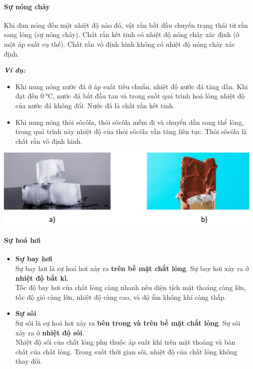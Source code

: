 \begin{tomtat}
\paragraph{Sự nóng chảy}
\begin{dn}
	Khi đun nóng đến một nhiệt độ nào đó, vật rắn bắt đầu chuyển trạng thái từ rắn sang lỏng (sự nóng chảy). Chất rắn kết tinh có nhiệt độ nóng chảy xác định (ở một áp suất cụ thể). Chất rắn vô định hình không có nhiệt độ nóng chảy xác định.\\
\end{dn}
	\textbf{\textit{Ví dụ:}}
	\begin{itemize}
		\item Khi nung nóng nước đá ở áp suất tiêu chuẩn, nhiệt độ nước đá tăng dần. Khi đạt đến $\SI{0}{\celsius}$, nước đá bắt đầu tan và trong suốt quá trình hoá lỏng nhiệt độ của nước đá không đổi. Nước đá là chất rắn kết tinh.
		\item Khi nung nóng thỏi sôcôla, thỏi sôcôla mềm đi và chuyển dần sang thể lỏng, trong quá trình này nhiệt độ của thỏi sôcôla vẫn tăng liên tục. Thỏi sôcôla là chất rắn vô định hình.
	\end{itemize}
	\begin{center}
		\includegraphics[width=0.6\linewidth]{figs/VN12-Y24-PH-SYL-001-5}
	\end{center}
\paragraph{Sự hoá hơi}
\begin{dn}
	\begin{itemize}
		\item \textbf{Sự bay hơi}\\
		Sự bay hơi là sự hoá hơi xảy ra \textbf{trên bề mặt chất lỏng}. Sự bay hơi xảy ra ở \textbf{nhiệt độ bất kì}.\\
		Tốc độ bay hơi của chất lỏng càng nhanh nếu diện tích mặt thoáng càng lớn, tốc độ gió càng lớn, nhiệt độ càng cao, và độ ẩm không khí càng thấp.
		\item \textbf{Sự sôi}\\
		Sự sôi là sự hoá hơi xảy ra \textbf{bên trong và trên bề mặt chất lỏng}. Sự sôi xảy ra ở \textbf{nhiệt độ sôi}.\\
		Nhiệt độ sôi của chất lỏng phụ thuộc áp suất khí trên mặt thoáng và bản chất của chất lỏng. Trong suốt thời gian sôi, nhiệt độ của chất lỏng không thay đổi.
	\end{itemize}
\end{dn}
\begin{center}
	

\end{center}
\end{tomtat}
